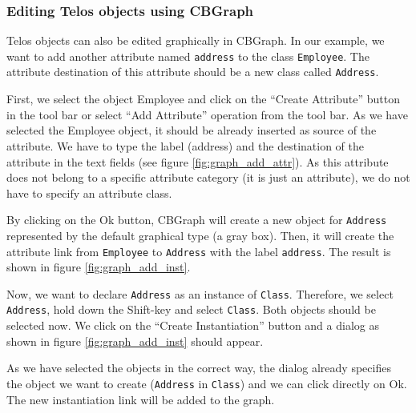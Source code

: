 \subsubsection{Editing Telos objects using CBGraph}

Telos objects can also be edited graphically in CBGraph. In our
example, we want to add another attribute named {\tt address} to the class {\tt Employee}.
The attribute destination of this attribute should be a new class called {\tt Address}.


First, we select the object Employee and click on the ``Create Attribute'' button in
the tool bar or select ``Add Attribute'' operation from the tool bar. As we have
selected the Employee object, it should be already inserted as source of
the attribute. We have to type the label (address) and the destination
of the attribute in the text fields (see figure \ref{fig:graph_add_attr}).
As this attribute does not belong to a specific attribute category (it is
just an attribute), we do not have to specify an attribute class.

By clicking on the Ok button, CBGraph will create a new object
for {\tt Address} represented by the default graphical type (a gray box).
Then, it will create the attribute link from {\tt Employee} to {\tt Address}
with the label {\tt address}. The result is shown in figure \ref{fig:graph_add_inst}.

Now, we want to declare {\tt Address} as an instance of {\tt Class}. Therefore, we
select {\tt Address}, hold down the Shift-key and select {\tt Class}. Both objects should
be selected now. We click on the ``Create Instantiation'' button and a dialog as shown
in figure \ref{fig:graph_add_inst} should appear.



As we have selected the objects in the correct way, the dialog already specifies the
object we want to create ({\tt Address} in {\tt Class}) and we can click directly on Ok.
The new instantiation link will be added to the graph.


